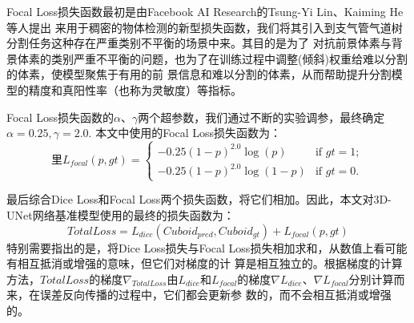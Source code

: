 Focal Loss损失函数最初是由Facebook AI Research的Tsung-Yi Lin、Kaiming He等人\cite{Lin2017FocalLF}提出
来用于稠密的物体检测的新型损失函数，我们将其引入到支气管气道树分割任务这种存在严重类别不平衡的场景中来。其目的是为了
对抗前景体素与背景体素的类别严重不平衡的问题，也为了在训练过程中调整(倾斜)权重给难以分割的体素，使模型聚焦于有用的前
景信息和难以分割的体素，从而帮助提升分割模型的精度和真阳性率（也称为灵敏度）等指标。

Focal Loss损失函数的$\alpha$、$\gamma$两个超参数，我们通过不断的实验调参，最终确定$\alpha = 0.25, \gamma = 2.0$. 本文中使用的Focal Loss损失函数为：
\begin{equation}里\label{eq:focal_loss}
	L_{focal}(p, gt) = \begin{cases}
		- 0.25 (1 - p)^{2.0} \log{(p)} & \text{if } gt = 1; \\
		- 0.25 (1 - p)^{2.0} \log{(1 - p)}  & \text{if } gt = 0.
	\end{cases}
\end{equation}

最后综合Dice Loss和Focal Loss两个损失函数，将它们相加。因此，本文对3D-UNet网络基准模型使用的最终的损失函数为：
\begin{equation}\label{eq:total_loss}
	\mathit{TotalLoss} = L_{dice}\left(Cuboid_{pred}, Cuboid_{gt}\right) + L_{focal}(p, gt)
\end{equation}
特别需要指出的是，将Dice Loss损失与Focal Loss损失相加求和，从数值上看可能有相互抵消或增强的意味，但它们对梯度的计
算是相互独立的。根据梯度的计算方法，$\mathit{TotalLoss}$的梯度$\nabla_{\mathit{TotalLoss}}$由$L_{dice}$和$L_{focal}$的梯度$\nabla{L_{dice}}$、$\nabla{L_{focal}}$分别计算而来，在误差反向传播的过程中，它们都会更新参
数的，而不会相互抵消或增强的。



